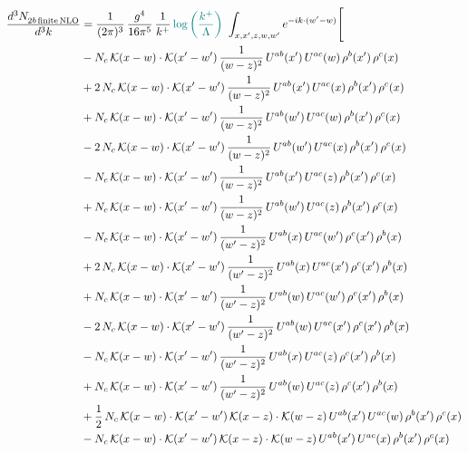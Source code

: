 \documentclass[9pt]{article}
\numberwithin{equation}{section}
\begin{document}
\begin{align}
    \frac{d^{3}N_{2b\,\rm finite\, NLO}^{\rm}}{d^{3}k} & = \frac{1}{(2\pi)^{3}}\,\frac{g^{4}}{16\pi^{5}}\,\frac{1}{k^{+}}\,{\color{teal}\log{\left(\frac{k^{+}}{\Lambda}\right)}}\,\,\int_{x,x',z,w,w'}e^{-ik\cdot(w'-w)}\Bigg[\notag\\ & -N_{c}\,\mathcal{K}(x-w)\cdot\mathcal{K}(x'-w')\,\frac{1}{(w-z)^{2}}\,U^{ab}(x')\,U^{ac}(w)\,\rho^{b}(x')\,\rho^{c}(x)\notag\\
&+2\,N_{c}\,\mathcal{K}(x-w)\cdot\mathcal{K}(x'-w')\,\frac{1}{(w-z)^{2}}\,U^{ab}(x')\,U^{ac}(x)\,\rho^{b}(x')\,\rho^{c}(x)\notag\\
&+N_{c}\,\mathcal{K}(x-w)\cdot\mathcal{K}(x'-w')\,\frac{1}{(w-z)^{2}}\,U^{ab}(w')\,U^{ac}(w)\,\rho^{b}(x')\,\rho^{c}(x)\notag\\
&-2\,N_{c}\,\mathcal{K}(x-w)\cdot\mathcal{K}(x'-w')\,\frac{1}{(w-z)^{2}}\,U^{ab}(w')\,U^{ac}(x)\,\rho^{b}(x')\,\rho^{c}(x)\notag\\
&-N_{c}\,\mathcal{K}(x-w)\cdot\mathcal{K}(x'-w')\,\frac{1}{(w-z)^{2}}\,U^{ab}(x')\,U^{ac}(z)\,\rho^{b}(x')\,\rho^{c}(x)\notag\\
&+N_{c}\,\mathcal{K}(x-w)\cdot\mathcal{K}(x'-w')\,\frac{1}{(w-z)^{2}}\,U^{ab}(w')\,U^{ac}(z)\,\rho^{b}(x')\,\rho^{c}(x)\notag\\
&-N_{c}\,\mathcal{K}(x-w)\cdot\mathcal{K}(x'-w')\,\frac{1}{(w'-z)^{2}}\,U^{ab}(x)\,U^{ac}(w')\,\rho^{c}(x')\,\rho^{b}(x)\notag\\
&+2\,N_{c}\,\mathcal{K}(x-w)\cdot\mathcal{K}(x'-w')\,\frac{1}{(w'-z)^{2}}\,U^{ab}(x)\,U^{ac}(x')\,\rho^{c}(x')\,\rho^{b}(x)\notag\\
&+N_{c}\,\mathcal{K}(x-w)\cdot\mathcal{K}(x'-w')\,\frac{1}{(w'-z)^{2}}\,U^{ab}(w)\,U^{ac}(w')\,\rho^{c}(x')\,\rho^{b}(x)\notag\\
&-2\,N_{c}\,\mathcal{K}(x-w)\cdot\mathcal{K}(x'-w')\,\frac{1}{(w'-z)^{2}}\,U^{ab}(w)\,U^{ac}(x')\,\rho^{c}(x')\,\rho^{b}(x)\notag\\
&-N_{c}\,\mathcal{K}(x-w)\cdot\mathcal{K}(x'-w')\,\frac{1}{(w'-z)^{2}}\,U^{ab}(x)\,U^{ac}(z)\,\rho^{c}(x')\,\rho^{b}(x)\notag\\
&+N_{c}\,\mathcal{K}(x-w)\cdot\mathcal{K}(x'-w')\,\frac{1}{(w'-z)^{2}}\,U^{ab}(w)\,U^{ac}(z)\,\rho^{c}(x')\,\rho^{b}(x)\notag\\
&+\frac{1}{2}\,N_{c}\,\mathcal{K}(x-w)\cdot\mathcal{K}(x'-w')\,\mathcal{K}(x-z)\cdot\mathcal{K}(w-z)\,U^{ab}(x')\,U^{ac}(w)\,\rho^{b}(x')\,\rho^{c}(x)\notag\\
&-N_{c}\,\mathcal{K}(x-w)\cdot\mathcal{K}(x'-w')\,\mathcal{K}(x-z)\cdot\mathcal{K}(w-z)\,U^{ab}(x')\,U^{ac}(x)\,\rho^{b}(x')\,\rho^{c}(x)\notag\\

\end{align}
\end{document}
